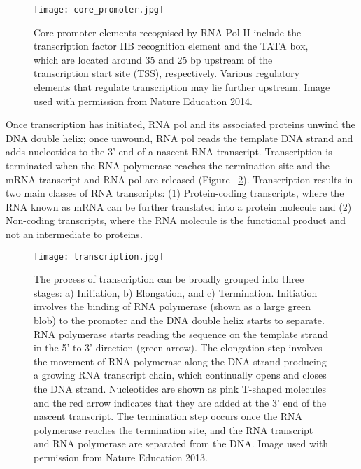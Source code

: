 \begin{figure}[!ht]
   \centering
   \texttt{[image: core\_promoter.jpg]}
   \caption[Core promoter elements]{Core promoter elements recognised by RNA Pol II include the transcription factor IIB recognition element and the TATA box, which are located around 35 and 25 bp upstream of the transcription start site (TSS), respectively. Various regulatory elements that regulate transcription may lie further upstream. Image used with permission from Nature Education 2014.}
   \label{fig:core_promoter}
\end{figure}

Once transcription has initiated, RNA pol and its associated proteins unwind the DNA double helix; once unwound, RNA pol reads the template DNA strand and adds nucleotides to the 3' end of a nascent RNA transcript. Transcription is terminated when the RNA polymerase reaches the termination site and the mRNA transcript and RNA pol are released (Figure ~\ref{fig:transcription}). Transcription results in two main classes of RNA transcripts: (1) Protein-coding transcripts, where the RNA known as mRNA can be further translated into a protein molecule and (2) Non-coding transcripts, where the RNA molecule is the functional product and not an intermediate to proteins.

\begin{figure}[!ht]
   \centering
   \texttt{[image: transcription.jpg]}
   \caption[DNA transcription]{The process of transcription can be broadly grouped into three stages: a) Initiation, b) Elongation, and c) Termination. Initiation involves the binding of RNA polymerase (shown as a large green blob) to the promoter and the DNA double helix starts to separate. RNA polymerase starts reading the sequence on the template strand in the 5' to 3' direction (green arrow). The elongation step involves the movement of RNA polymerase along the DNA strand producing a growing RNA transcript chain, which continually opens and closes the DNA strand. Nucleotides are shown as pink T-shaped molecules and the red arrow indicates that they are added at the 3' end of the nascent transcript. The termination step occurs once the RNA polymerase reaches the termination site, and the RNA transcript and RNA polymerase are separated from the DNA. Image used with permission from Nature Education 2013.}
   \label{fig:transcription}
\end{figure}


